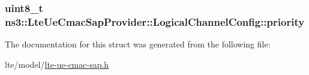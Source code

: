 \subsubsection[{\texorpdfstring{priority}{priority}}]{\setlength{\rightskip}{0pt plus 5cm}uint8\+\_\+t ns3\+::\+Lte\+Ue\+Cmac\+Sap\+Provider\+::\+Logical\+Channel\+Config\+::priority}\hypertarget{structns3_1_1LteUeCmacSapProvider_1_1LogicalChannelConfig_a888f361757024fac54e5b1e704872303}{}\label{structns3_1_1LteUeCmacSapProvider_1_1LogicalChannelConfig_a888f361757024fac54e5b1e704872303}


The documentation for this struct was generated from the following file\+:\begin{DoxyCompactItemize}
\item 
lte/model/\hyperlink{lte-ue-cmac-sap_8h}{lte-\/ue-\/cmac-\/sap.\+h}\end{DoxyCompactItemize}
